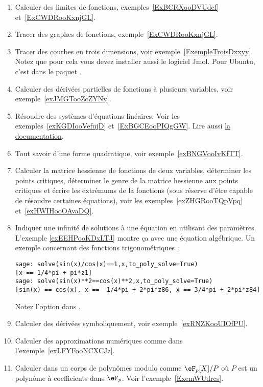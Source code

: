 \begin{enumerate}

	\item
	      Calculer des limites de fonctions, exemples~\ref{ExBCRXooDVUdcf} et~\ref{ExCWDRooKxnjGL}.
	\item
	      Tracer des graphes de fonctions, exemple~\ref{ExCWDRooKxnjGL}.
	\item
	      Tracer des courbes en trois dimensions, voir exemple~\ref{ExempleTroisDxxyy}. Notez que pour cela vous devez installer aussi le logiciel Jmol. Pour Ubuntu, c'est dans le paquet .
	\item
	      Calculer des dérivées partielles de fonctions à plusieurs variables, voir exemple~\ref{exJMGTooZcZYNy}.
	\item
	      Résoudre des systèmes d'équations linéaires. Voir les exemples~\ref{exKGDIooVefujD} et~\ref{ExBGCEooPIQgGW}. Lire aussi \href{http://www.sagemath.org/doc/constructions/linear_algebra.html#solving-systems-of-linear-equations}{la documentation}.
	\item
	      Tout savoir d'une forme quadratique, voir exemple~\ref{exBNGVooIvKfTT}.
	\item
	      Calculer la matrice hessienne de fonctions de deux variables, déterminer les points critiques, déterminer le genre de la matrice hessienne aux points critiques et écrire les extrémums de la fonctions (sous réserve d'être capable de résoudre certaines équations), voir les exemples~\ref{exZHGRooTQpVpq} et~\ref{exHWIHooOAvaDQ}.
	\item
	      Indiquer une infinité de solutions à une équation en utilisant des paramètres. L'exemple \ref{exEEHPooKDxLTJ} montre ça avec une équation algébrique. Un exemple concernant des fonctions trigonométriques :
	      \begin{verbatim}
sage: solve(sin(x)/cos(x)==1,x,to_poly_solve=True)
[x == 1/4*pi + pi*z1]
sage: solve(sin(x)**2==cos(x)**2,x,to_poly_solve=True)
[sin(x) == cos(x), x == -1/4*pi + 2*pi*z86, x == 3/4*pi + 2*pi*z84]
        \end{verbatim}

	      Notez l'option  dans .

	\item
	      Calculer des dérivées symboliquement, voir exemple~\ref{exRNZKooUIOfPU}.
	\item
	      Calculer des approximations numériques comme dans l'exemple~\ref{exLFYFooNCXCJz}.
	\item
	      Calculer dans un corps de polynômes modulo comme \( \eF_p[X]/P\) où \( P\) est un polynôme à coefficients dans \( \eF_p\). Voir l'exemple~\ref{ExemWUdrcs}.
\end{enumerate}

